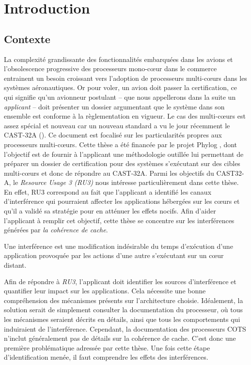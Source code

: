 \section{Introduction}
\label{fr:sec:introduction}
\subsection{Contexte}
La complexité grandissante des fonctionnalités embarquées dans les avions et l'obsolescence
progressive des processeurs mono-c\oe{}ur dans le commerce entrainent un besoin croissant
vers l'adoption de processeurs multi-c\oe{}urs dans les syst\`emes aéronautiques.
Or pour voler, un avion doit passer la certification, ce qui signifie
qu'un avionneur postulant -- que nous appellerons dans la suite un \emph{applicant} --
doit pr\'esenter un dossier argumentant que le système dans son ensemble est conforme \`a la
règlementation en vigueur.
Le cas des multi-c\oe{}urs est assez spécial et nouveau car un nouveau standard a vu le jour récemment
le CAST-32A (\cite{cast32}). Ce document est focalisé sur les particularités propres aux processeurs
multi-c\oe{}urs.
Cette th\`ese  a été financée par le  projet Phylog \cite{erts18}, dont 
l'objectif est de fournir à l'applicant une méthodologie outillée lui permettant
de préparer un dossier de certification pour des syst\`emes s'exécutant sur des cibles multi-c\oe{}urs
et donc de répondre au CAST-32A.
Parmi les objectifs du CAST32-A, le \textit{Resource Usage 3 (RU3)} nous intéresse particulièrement dans cette thèse.
En effet, RU3  correspond
au fait que l'applicant a identifié les canaux d'interférence qui pourraient
affecter les applications hébergées sur les c\oe{}urs et qu'il a
validé sa stratégie  pour en atténuer les effets nocifs.
Afin d'aider l'applicant à remplir cet objectif, cette thèse se concentre sur les
interférences
générées par \emph{la cohérence de cache}.

\begin{definition}[Interférence]
Une interférence est une modification indésirable du temps d'exécution d'une
application  provoquée par les actions d'une autre s'exécutant sur un c\oe{}ur distant.
\end{definition}

Afin de répondre à \textit{RU3}, l'applicant doit identifier
les sources d'interférence et quantifier leur impact sur les applications. Cela nécessite
une bonne compréhension des mécanismes présents sur l'architecture choisie.
Idéalement, la solution serait de simplement consulter la documentation
du processeur, où tous les mécanismes seraient décrits en détails, ainsi que
tous les comportements qui induiraient de l'interférence. Cependant, la
documentation des processeurs COTS n'inclut généralement pas de détails sur
la cohérence de cache. C'est donc une première problématique adressée par cette
thèse. Une fois cette étape d'identification menée, il faut comprendre les effets des interférences.

